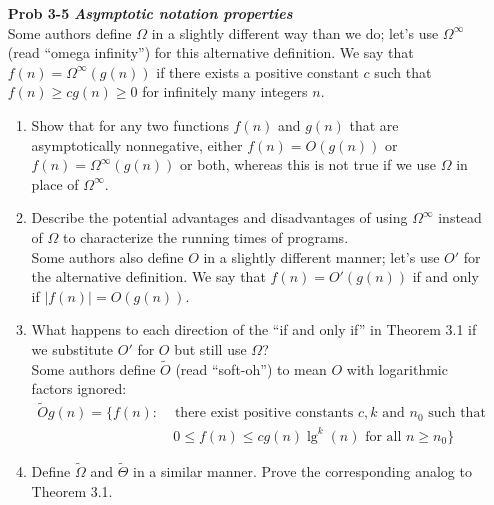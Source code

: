 \documentclass[fontsize=12pt,paper=a4]{book}
\begin{document}
\begin{enumerate}
	\item[\textbf{Prob 3-5}]
		\textbf{\textit{Asymptotic notation properties}}\\
			Some authors define $\Omega$ in a slightly different way than we do; let’s use $\Omega^\infty$ (read “omega infinity”) for this alternative definition. We say that $f(n) = \Omega^\infty (g(n))$ if there exists a positive constant $c$ such that $f(n) \geq cg(n) \geq 0$ for infinitely many integers $n$.
			\begin{enumerate}
				\item Show that for any two functions $f(n)$ and $g(n)$ that are asymptotically nonnegative, either $f(n) = O(g(n))$ or $f(n) = \Omega^\infty(g(n))$ or both, whereas this is not true if we use $\Omega$ in place of $\Omega^\infty$.
				\item Describe the potential advantages and disadvantages of using $\Omega^\infty$ instead of $\Omega$ to characterize the running times of programs.\\
				Some authors also define $O$ in a slightly different manner; let’s use $O'$ for the alternative definition. We say that $f(n) = O'(g(n))$ if and only if $\lvert f(n) \rvert = O(g(n))$.
				\item What happens to each direction of the “if and only if” in Theorem 3.1 if we substitute $O'$ for $O$ but still use $\Omega$?\\
				Some authors define $\tilde{O}$ (read “soft-oh”) to mean $O$ with logarithmic factors ignored:
				\begin{equation*}
					\begin{split}
						\tilde{O}g(n) = \{f(n) : & \text{ there exist positive constants  } c, k \text{ and } n_0 \text{ such that }\\
						& \ 0\leq f(n) \leq cg(n)\lg^k(n) \text{ for all } n \geq n_0 \}
					\end{split}
				\end{equation*}
				\item Define $\tilde{\Omega}$ and $\tilde{\Theta}$ in a similar manner. Prove the corresponding analog to Theorem 3.1.
			\end{enumerate}
		

\end{enumerate}
\end{document}
